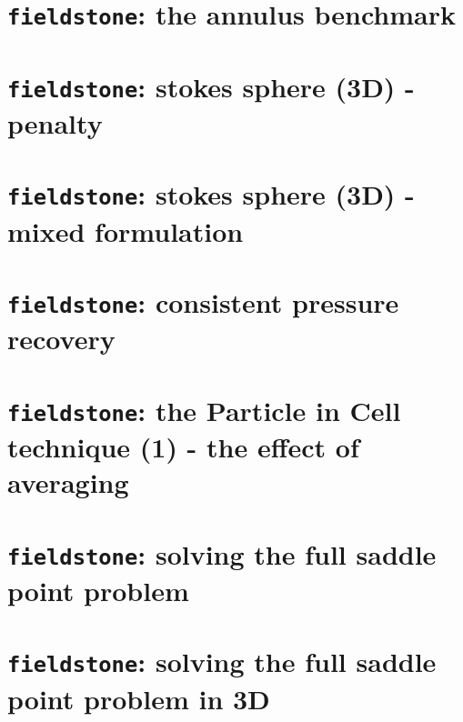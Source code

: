 \documentclass[a4paper]{article}
\begin{document}
\newpage
\section{{\tt fieldstone}: the annulus benchmark}



\newpage
\section{{\tt fieldstone}: stokes sphere (3D) - penalty\label{f5}}


\newpage
\section{{\tt fieldstone}: stokes sphere (3D) - mixed formulation\label{f5}}


\newpage
\section{{\tt fieldstone}: consistent pressure recovery }


\newpage
\section{{\tt fieldstone}: the Particle in Cell technique (1) - the effect of averaging}


\newpage
\section{{\tt fieldstone}: solving the full saddle point problem}


\newpage
\section{{\tt fieldstone}: solving the full saddle point problem in 3D}

\end{document}
